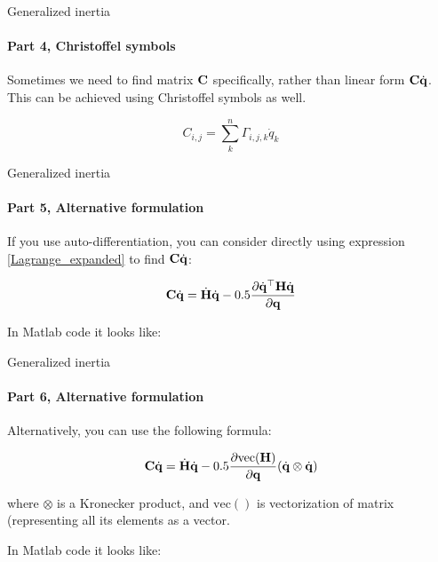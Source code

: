 \documentclass{beamer}
\begin{document}
\begin{frame}{Generalized inertia}
\framesubtitle{Part 4, Christoffel symbols}
\begin{flushleft}

Sometimes we need to find matrix $\mathbf{C}$ specifically, rather than linear form $\mathbf{C}\dot{\mathbf{q}}$. This can be achieved using Christoffel symbols as well.

\begin{equation}
    C_{i, j} = 
    \sum\limits_{k}^{n} \Gamma_{i,j,k} \dot{q}_k
\end{equation}
     
\end{flushleft}
\end{frame}




\begin{frame}{Generalized inertia}
\framesubtitle{Part 5, Alternative formulation}
\begin{flushleft}

If you use auto-differentiation, you can consider directly using expression \eqref{Lagrange_expanded} to find $\mathbf{C}\dot{\mathbf{q}}$:

\begin{equation}
    \mathbf{C}\dot{\mathbf{q}} = 
    \dot{\mathbf{H}} \dot{\mathbf{q}} - 
    0.5 \frac{\partial  \dot{\mathbf{q}}^\top \mathbf{H} \dot{\mathbf{q}}}
     {\partial \mathbf{q}} 
\end{equation}

In Matlab code it looks like:


     
\end{flushleft}
\end{frame}



\begin{frame}{Generalized inertia}
\framesubtitle{Part 6, Alternative formulation}
\begin{flushleft}

Alternatively, you can use the following formula:

\begin{equation}
    \mathbf{C}\dot{\mathbf{q}} = 
    \dot{\mathbf{H}} \dot{\mathbf{q}} - 
    0.5 \frac{\partial \text{vec}( \mathbf{H} ) }
     {\partial \mathbf{q}} (\dot{\mathbf{q}} \otimes \dot{\mathbf{q}}) 
\end{equation}

where $\otimes$ is a Kronecker product, and $\text{vec}()$ is vectorization of matrix (representing all its elements as a vector. 

\bigskip

In Matlab code it looks like:


     
\end{flushleft}
\end{frame}
\end{document}
